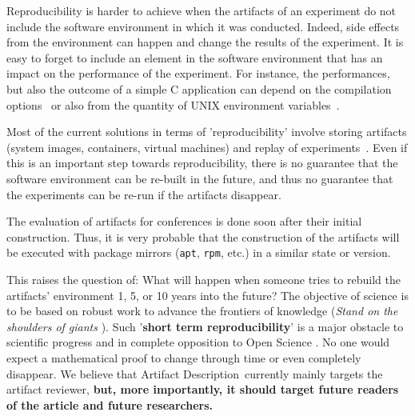 \documentclass[sigconf,natbib=false]{acmart}
\newcommand{\repro}{reproducibility}
\newcommand{\ad}{Artifact Description}
\newcommand{\fmc}[1]{{\color{magenta} #1}} %
\begin{document}

Reproducibility is harder to achieve when the artifacts of an experiment do not include the software environment in which it was conducted.
Indeed, side effects from the environment can happen and change the results of the experiment.
It is easy to forget to include an element in the software environment that has an impact on the performance of the experiment.
For instance, the performances, but also the outcome of a simple C application can depend on the compilation options\ \cite{stodden2018assessing} or also from the quantity of UNIX environment variables\ \cite{mytkowicz2009producing}.

Most of the current solutions in terms of '\repro' involve storing artifacts (system images, containers, virtual machines) and replay of experiments\ \cite{rosendo2020e2clab, brammer2011paper, brinckman2019computing}.
Even if this is an important step towards \repro, there is no guarantee that the software environment can be re-built in the future, and thus no guarantee that the experiments can be re-run if the artifacts disappear. 

The evaluation of artifacts for conferences is done soon after their initial construction.
Thus, it is very probable that the construction of the artifacts will be executed with package mirrors (\texttt{apt}, \texttt{rpm}, etc.) in a similar state or version.

This raises the question of: What will happen when someone tries to rebuild the artifacts' environment 1, 5, or 10 years into the future?
The objective of science is to be based on robust work to advance the frontiers of knowledge (\emph{Stand on the shoulders of giants} \cite{giant}).
Such '\textbf{short term reproducibility}' is a major obstacle to scientific progress and in complete opposition to Open Science \cite{openscience_unesco}.
No one would expect a mathematical proof to change through time or even completely disappear.
We believe that \ad\ currently mainly targets the artifact reviewer, \textbf{but, more importantly, it should target future readers of the article and future researchers.}
\end{document}
